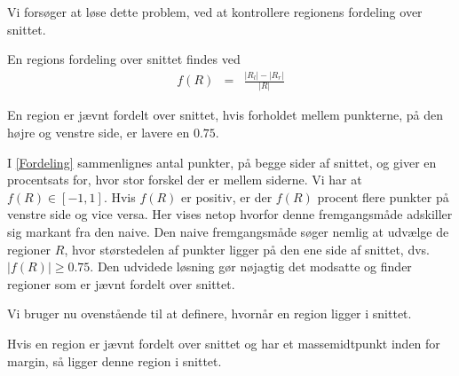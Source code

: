 {Vi forsøger at løse dette problem, ved at kontrollere regionens
fordeling over snittet.

\begin{definition}
    En regions fordeling over snittet findes ved
    \begin{eqnarray}
        f(R) & = & \frac{|R_{l}| - |R_{r}|}{|R|}
        \label{Fordeling}
    \end{eqnarray}
    \label{def_fordeling_ligning}
\end{definition}

\begin{definition}
    En region er jævnt fordelt over snittet, hvis forholdet mellem
    punkterne, på den højre og venstre side, er lavere en $0.75$.
    \label{def_fordeling_procent}
\end{definition}

I \eqref{Fordeling} sammenlignes antal punkter, på begge sider af
snittet, og giver en procentsats for, hvor stor forskel der er mellem
siderne. Vi har at $f(R) \in [-1,1]$.  Hvis $f(R)$ er positiv, er der
$f(R)$ procent flere punkter på venstre side og vice versa. Her vises
netop hvorfor denne fremgangsmåde adskiller sig markant fra den naive.
Den naive fremgangsmåde søger nemlig at udvælge de regioner $R$, hvor
størstedelen af punkter ligger på den ene side af snittet, dvs. $|f(R)|
\geq 0.75$. Den udvidede løsning gør nøjagtig det modsatte og finder
regioner som er jævnt fordelt over snittet.

Vi bruger nu ovenstående til at definere, hvornår en region ligger i
snittet.

\begin{definition}
    Hvis en region er jævnt fordelt over snittet og har et
    massemidtpunkt inden for margin, så ligger denne region i snittet.
    \label{def_expanded}
\end{definition}

%

}

